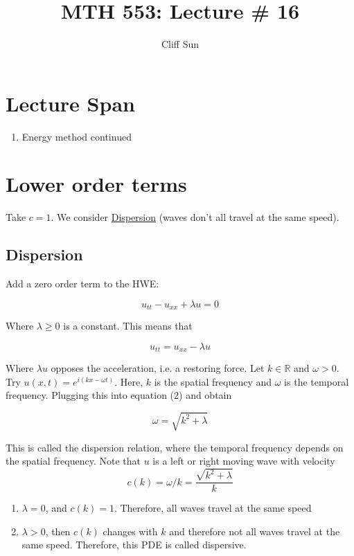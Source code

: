 \documentclass{article}
\title{MTH 553: Lecture \# 16}
\author{Cliff Sun}
\newtheorem{one minute paper}[theorem]{One Minute Paper}
\begin{document}
\maketitle

\section*{Lecture Span}
\begin{enumerate}
    \item Energy method continued
\end{enumerate}

\section*{Lower order terms}

Take $c=1$. We consider \underline{Dispersion} (waves don't all travel at the same speed). 

\subsection*{Dispersion}

Add a zero order term to the HWE: 

\begin{equation}
    u_{tt} - u_{xx} + \lambda u = 0
\end{equation}

Where $\lambda \geq 0$ is a constant. This means that 

\begin{equation}
    u_{tt} = u_{xx} - \lambda u
\end{equation}

Where $\lambda u$ opposes the acceleration, i.e. a restoring force. Let $k \in \mathbb{R}$ and $\omega > 0$. Try $u(x,t) = e^{i(kx - \omega t)}$. 
Here, $k$ is the spatial frequency and $\omega$ is the temporal frequency. Plugging this into equation (2) and obtain 

\begin{equation}
    \omega = \sqrt{k^2 + \lambda} 
\end{equation}

This is called the dispersion relation, where the temporal frequency depends on the spatial frequency. Note that $u$ is a left 
or right moving wave with velocity $$c(k) = \omega/k = \frac{\sqrt{k^2 + \lambda}}{k}$$

\begin{enumerate}
    \item $\lambda = 0$, and $c(k) = 1$. Therefore, all waves travel at the same speed
    \item $\lambda > 0$, then $c(k)$ changes with $k$ and therefore not all waves travel at the same speed. Therefore, this PDE is called dispersive. 
\end{enumerate}
\end{document}
